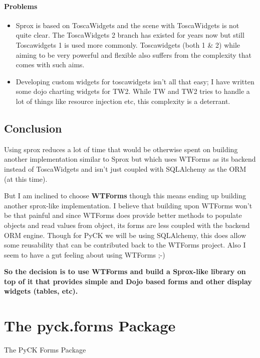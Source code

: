 \documentclass[letterpaper,10pt,english]{sphinxmanual}
\begin{document}
\subsubsection{Problems}
\label{form-validation-library-choice:id1}\begin{itemize}
\item {} 
Sprox is based on ToscaWidgets and the scene with ToscaWidgets is not quite clear. The ToscaWidgets 2 branch has existed for years now but still Toscawidgets 1 is used more commonly. Toscawidgets (both 1 \& 2) while aiming to be very powerful and flexible also suffers from the complexity that comes with such aims.

\item {} 
Developing custom widgets for toscawidgets isn't all that easy; I have written some dojo charting widgets for TW2. While TW and TW2 tries to handle a lot of things like resource injection etc, this complexity is a deterrant.

\end{itemize}


\section{Conclusion}
\label{form-validation-library-choice:conclusion}
Using sprox reduces a lot of time that would be otherwise spent on building another implementation similar to Sprox but which uses WTForms as its backend instead of ToscaWidgets and isn't just coupled with SQLAlchemy as the ORM (at this time).

But I am inclined to choose \textbf{WTForms} though this means ending up building another sprox-like implementation. I believe that building upon WTForms won't be that painful and since WTForms does provide better methods to populate objects and read values from object, its forms are less coupled with the backend ORM engine. Though for PyCK we will be using SQLAlchemy, this does allow some reusability that can be contributed back to the WTForms project. Also I seem to have a gut feeling about using WTForms ;-)

\textbf{So the decision is to use WTForms and build a Sprox-like library on top of it that provides simple and Dojo based forms and other display widgets (tables, etc).}


\chapter{The pyck.forms Package}
\label{pyck-forms:module-pyck.forms}\label{pyck-forms:pyck-forms}\label{pyck-forms::doc}\label{pyck-forms:the-pyck-forms-package}\label{pyck-forms:module-pyck.forms}
The PyCK Forms Package
\end{document}
